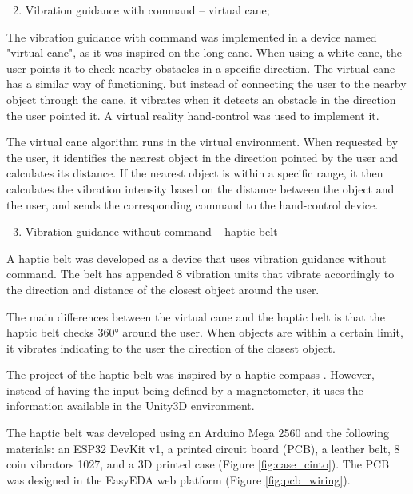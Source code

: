         \begin{enumerate} [label = \Alph*)]
            \setcounter{enumi}{1}
            \item Vibration guidance with command – virtual cane;
        \end{enumerate}

        The vibration guidance with command was implemented in a device named "virtual cane", as it was inspired on the long cane. When using a white cane, the user points it to check nearby obstacles in a specific direction. The virtual cane has a similar way of functioning, but instead of connecting the user to the nearby object through the cane, it vibrates when it detects an obstacle in the direction the user pointed it. A virtual reality hand-control was used to implement it. 

        The virtual cane algorithm runs in the virtual environment. When requested by the user, it identifies the nearest object in the direction pointed by the user and calculates its distance. If the nearest object is within a specific range, it then calculates the vibration intensity based on the distance between the object and the user, and sends the corresponding command to the hand-control device.

        \begin{enumerate} [label = \Alph*)]
            \setcounter{enumi}{2}
            \item Vibration guidance without command – haptic belt
        \end{enumerate}

        A haptic belt was developed as a device that uses vibration guidance without command. The belt has appended 8 vibration units that vibrate accordingly to the direction and distance of the closest object around the user. 

        The main differences between the virtual cane and the haptic belt is that the haptic belt checks 360° around the user. When objects are within a certain limit, it vibrates indicating to the user the direction of the closest object. 

        The project of the haptic belt was inspired by a haptic compass \cite{kylecorry31_instructables_2020}. However, instead of having the input being defined by a magnetometer, it uses the information available in the Unity3D environment.

        The haptic belt was developed using an Arduino Mega 2560 and the following materials: an ESP32 DevKit v1, a printed circuit board (PCB), a leather belt, 8 coin vibrators 1027, and a 3D printed case (Figure \ref{fig:case_cinto}). The PCB was designed in the EasyEDA web platform (Figure \ref{fig:pcb_wiring}). 

